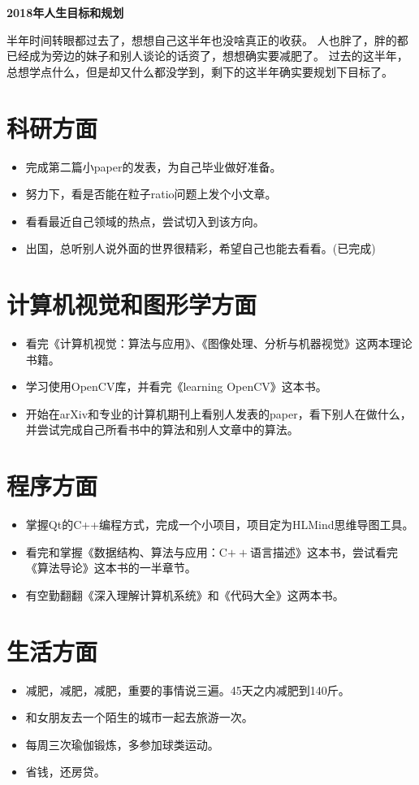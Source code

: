 \documentclass[12pt]{article}
\newcommand{\Done}{{\color{magenta}(已完成)}}
\begin{document}
\begin{center}
  {\huge{\textbf{2018年人生目标和规划}}}
\end{center}
\par
半年时间转眼都过去了，想想自己这半年也没啥真正的收获。%
人也胖了，胖的都已经成为旁边的妹子和别人谈论的话资了，想想确实要减肥了。%
过去的这半年，总想学点什么，但是却又什么都没学到，剩下的这半年确实要规划下目标了。%


\section{科研方面}
\begin{itemize}
\item{完成第二篇小paper的发表，为自己毕业做好准备。}%
\item{努力下，看是否能在粒子ratio问题上发个小文章。}%
\item{看看最近自己领域的热点，尝试切入到该方向。}
\item{出国，总听别人说外面的世界很精彩，希望自己也能去看看。\Done}%
\end{itemize}

\section{计算机视觉和图形学方面}
\begin{itemize}
\item{看完《计算机视觉：算法与应用》、《图像处理、分析与机器视觉》这两本理论书籍。}
\item{学习使用OpenCV库，并看完《learning OpenCV》这本书。}
\item{开始在arXiv和专业的计算机期刊上看别人发表的paper，看下别人在做什么，%
    并尝试完成自己所看书中的算法和别人文章中的算法。}
\end{itemize}

\section{程序方面}
\begin{itemize}
\item{掌握Qt的C++编程方式，完成一个小项目，项目定为HLMind思维导图工具。}
\item{看完和掌握《数据结构、算法与应用：C$++$语言描述》这本书，尝试看完《算法导论》这本书的一半章节。}
\item{有空勤翻翻《深入理解计算机系统》和《代码大全》这两本书。}
\end{itemize}

\section{生活方面}
\begin{itemize}
\item{减肥，减肥，减肥，重要的事情说三遍。45天之内减肥到140斤。}
\item{和女朋友去一个陌生的城市一起去旅游一次。}
\item{每周三次瑜伽锻炼，多参加球类运动。}
\item{省钱，还房贷。}
\end{itemize}
\end{document}
